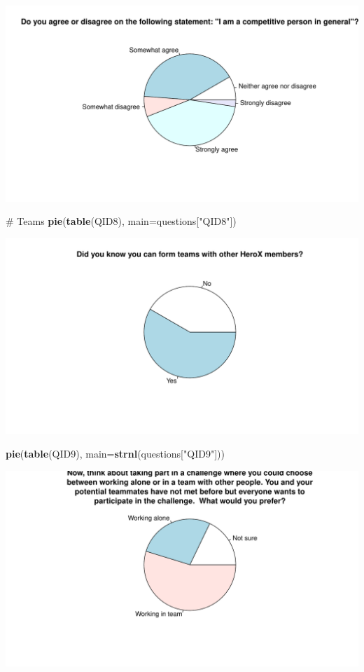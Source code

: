 \documentclass[12pt, titlepage]{article}
\newenvironment{Shaded}{\begin{snugshade}}{\end{snugshade}}
\newcommand{\KeywordTok}[1]{\textcolor[rgb]{0.12,0.11,0.11}{\textbf{#1}}}
\newcommand{\DataTypeTok}[1]{\textcolor[rgb]{0.00,0.34,0.68}{#1}}
\newcommand{\StringTok}[1]{\textcolor[rgb]{0.75,0.01,0.01}{#1}}
\newcommand{\CommentTok}[1]{\textcolor[rgb]{0.54,0.53,0.53}{#1}}
\newcommand{\NormalTok}[1]{\textcolor[rgb]{0.12,0.11,0.11}{#1}}
\begin{document}
\includegraphics{analysis_survey_files/figure-latex/unnamed-chunk-2-7.pdf}

\begin{Shaded}
\begin{Highlighting}[]
\CommentTok{# Teams}
\KeywordTok{pie}\NormalTok{(}\KeywordTok{table}\NormalTok{(QID8), }\DataTypeTok{main=}\NormalTok{questions[}\StringTok{"QID8"}\NormalTok{])}
\end{Highlighting}
\end{Shaded}

\includegraphics{analysis_survey_files/figure-latex/unnamed-chunk-2-8.pdf}

\begin{Shaded}
\begin{Highlighting}[]
\KeywordTok{pie}\NormalTok{(}\KeywordTok{table}\NormalTok{(QID9), }\DataTypeTok{main=}\KeywordTok{strnl}\NormalTok{(questions[}\StringTok{"QID9"}\NormalTok{]))}
\end{Highlighting}
\end{Shaded}

\includegraphics{analysis_survey_files/figure-latex/unnamed-chunk-2-9.pdf}
\end{document}
